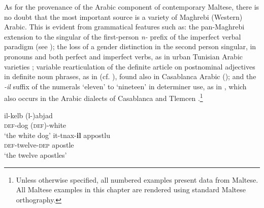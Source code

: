 \documentclass[output=paper]{langsci/langscibook}
\begin{document}
As for the provenance of the Arabic component of contemporary Maltese, there is no doubt that the most important source is a variety of Maghrebi (Western) Arabic. This is evident from grammatical features such as: the pan-Maghrebi extension to the singular of the first-person \textit{n-} prefix of the imperfect verbal paradigm 
(see ); the loss of a gender distinction in the second person singular, in pronouns and both perfect and imperfect verbs, as in urban Tunisian Arabic varieties \citep{Gibson2011}; variable rearticulation of the definite article on postnominal adjectives in definite noun phrases, as in  (cf. \citealt{Gatt2018}), found also in Casablanca Arabic (\citealt[205]{Harrell2004}); and the \textit{-il} suffix of the numerals `eleven' to `nineteen' in determiner use, as in , which also occurs in the Arabic dialects of Casablanca \citep{Caubet2011} and Tlemcen \citep{Taine-Cheikh2011numerals}.\footnote{Unless otherwise specified, all numbered examples present data from Maltese. All Maltese examples in this chapter are rendered using standard Maltese orthography.}


\begin{table}
\caption{First-person imperfect `write' in Eastern and Western Arabic}
\label{tab:1:niktib}
\end{table}


\ea\label{ex:optionalarticle}
\gll il-kelb (l-)abjad\\  
     \textsc{def}-dog (\textsc{def})-white\\ 
\glt `the white dog' 
\z
\ea\label{ex:apostles}
\gll it-tnax-\textbf{il} appostlu\\  
     \textsc{def}-twelve-\textsc{dep} apostle\\ 
\glt `the twelve apostles'
\z
\end{document}
